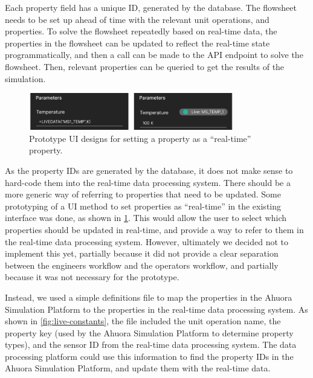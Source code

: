 Each property field has a unique ID, generated by the database. The flowsheet needs to be set up ahead of time with the relevant unit operations, and properties. To solve the flowsheet repeatedly based on real-time data, the properties in the flowsheet can be updated to reflect the real-time state programmatically, and then a call can be made to the API endpoint to solve the flowsheet. Then, relevant properties can be queried to get the results of the simulation.

\begin{figure}
    \centering
    \includegraphics[width=0.8\textwidth]{property_ui.png}
    \caption{Prototype UI designs for setting a property as a ``real-time'' property.}
    \label{fig:property-ui}
\end{figure}

As the property IDs are generated by the database, it does not make sense to hard-code them into the real-time data processing system. There should be a more generic way of referring to properties that need to be updated. 
Some prototyping of a UI method to set properties as ``real-time'' in the existing interface was done, as shown in \cref{fig:property-ui}. 
This would allow the user to select which properties should be updated in real-time, and provide a way to refer to them in the real-time data processing system. 
However, ultimately we decided not to implement this yet, partially because it did not provide a clear separation between the engineers workflow and the operators workflow, and partially because it was not necessary for the prototype.

Instead, we used a simple definitions file to map the properties in the Ahuora Simulation Platform to the properties in the real-time data processing system. 
As shown in \cref{fig:live-constants}, the file included the unit operation name, the property key (used by the Ahuora Simulation Platform to determine property types), and the sensor ID from the real-time data processing system. 
The data processing platform could use this information to find the property IDs in the Ahuora Simulation Platform, and update them with the real-time data.

